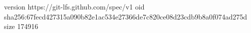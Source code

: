 version https://git-lfs.github.com/spec/v1
oid sha256:67fecd427315a090b82e1ac534e27366de7c820ce08d23cdb9b8a0f074ad275d
size 174916
